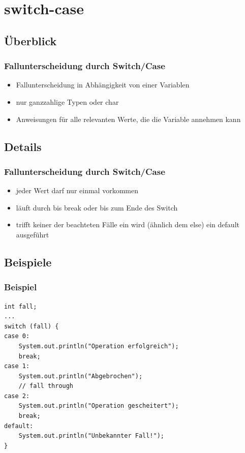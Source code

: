 \documentclass[final]{beamer}
\begin{document}
\section{switch-case}
\subsection{Überblick}
\begin{frame}[containsverbatim]
	\frametitle{Fallunterscheidung durch Switch/Case}
	\begin{itemize}
		\item{Fallunterscheidung in Abhängigkeit von einer Variablen}
		\item{nur ganzzahlige Typen oder char}
		\item{Anweisungen für alle relevanten Werte, die die Variable annehmen kann}
	\end{itemize}
\end{frame}

\subsection{Details}
\begin{frame}[containsverbatim]
  \frametitle{Fallunterscheidung durch Switch/Case}
  \begin{itemize}
	\item{jeder Wert darf nur einmal vorkommen}
	\item{läuft durch bis break oder bis zum Ende des Switch}
	\item{trifft keiner der beachteten Fälle ein wird (ähnlich dem else) ein default ausgeführt}
  \end{itemize}
\end{frame}


\subsection{Beispiele}
\begin{frame}[containsverbatim]
	\frametitle{Beispiel}
	\begin{lstlisting}
int fall;
...
switch (fall) {
case 0:
	System.out.println("Operation erfolgreich");
	break;
case 1:
	System.out.println("Abgebrochen");
	// fall through
case 2:
	System.out.println("Operation gescheitert");
	break;
default:
	System.out.println("Unbekannter Fall!");
}
	\end{lstlisting}
\end{frame}
\end{document}
